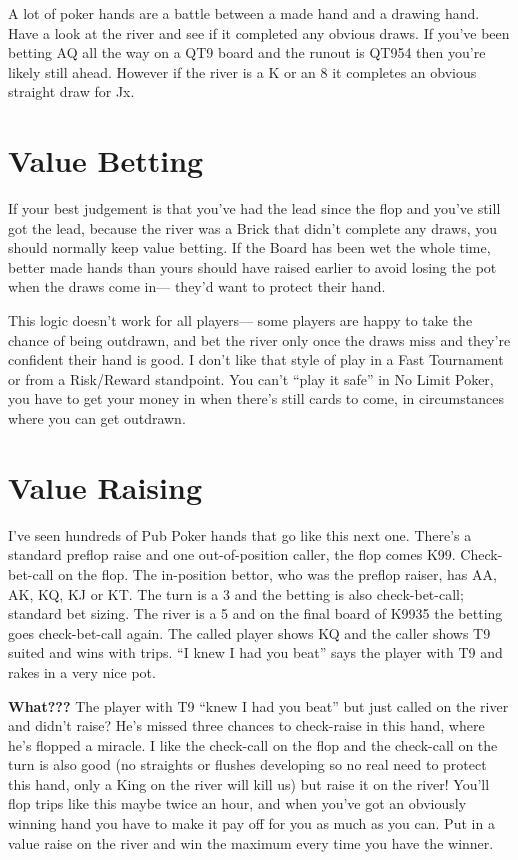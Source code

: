 A lot of poker hands are a battle between a made hand and a drawing
hand. Have a look at the river and see if it completed any obvious
draws. If you've been betting AQ all the way on a QT9 board and the
runout is QT954 then you're likely still ahead. However if the river
is a K or an 8 it completes an obvious straight draw for Jx.

\section{Value Betting}

If your best judgement is that you've had the lead since the flop
and you've still got the lead, because the river was a Brick
that didn't complete any draws, you should normally keep value betting.
If the Board has been wet the whole time, better made hands than
yours should have raised earlier to avoid losing the pot when the
draws come in--- they'd want to protect their hand.

This logic doesn't work for all players--- some players are happy
to take the chance of being outdrawn, and bet the river only once
the draws miss and they're confident their hand is good. I don't
like that style of play in a Fast Tournament or from a
Risk/Reward standpoint. You can't ``play it safe'' in No Limit Poker,
you have to get your money in when there's still cards to come, in
circumstances where you can get outdrawn.

\section{Value Raising}

I've seen hundreds of Pub Poker hands that go like this next
one. There's a standard preflop raise and one out-of-position caller,
the flop comes K99. Check-bet-call on the flop. The in-position
bettor, who was the preflop raiser, has AA, AK, KQ, KJ or KT. The turn
is a 3 and the betting is also check-bet-call; standard bet
sizing. The river is a 5 and on the final board of K9935 the betting
goes check-bet-call again. The called player shows KQ and the caller
shows T9 suited and wins with trips. ``I knew I had you beat'' says the
player with T9 and rakes in a very nice pot.

\textbf{What???} The player with T9 ``knew I had you beat'' but just
called on the river and didn't raise? He's missed three chances to
check-raise in this hand, where he's flopped a miracle. I like the
check-call on the flop and the check-call on the turn is also good (no
straights or flushes developing so no real need to protect this hand,
only a King on the river will kill us) but raise it on the river!
You'll flop trips like this maybe twice an hour, and when you've
got an obviously winning hand you have to make it pay off for you as
much as you can. Put in a value raise on the river and win the maximum
every time you have the winner.

